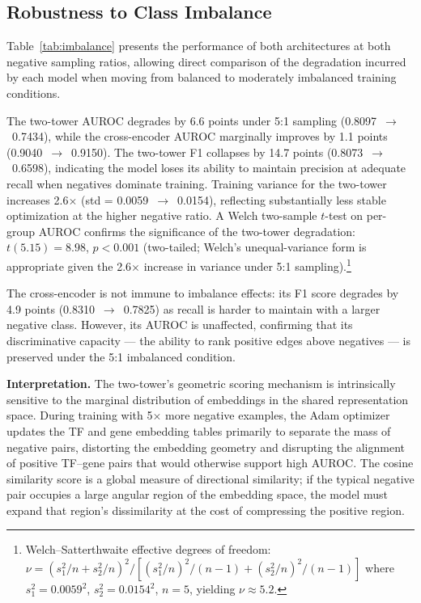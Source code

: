 \documentclass[journal]{IEEEtran}
\begin{document}
\subsection{Robustness to Class Imbalance}
\label{ssec:h2}

Table~\ref{tab:imbalance} presents the performance of both architectures at
both negative sampling ratios, allowing direct comparison of the degradation
incurred by each model when moving from balanced to moderately imbalanced
training conditions.

The two-tower AUROC degrades by 6.6 points under 5:1 sampling
(0.8097~$\to$~0.7434), while the cross-encoder AUROC marginally improves by
1.1 points (0.9040~$\to$~0.9150). The two-tower F1 collapses by 14.7 points
(0.8073~$\to$~0.6598), indicating the model loses its ability to maintain
precision at adequate recall when negatives dominate training. Training variance
for the two-tower increases 2.6$\times$ (std = 0.0059~$\to$~0.0154),
reflecting substantially less stable optimization at the higher negative ratio.
A Welch two-sample $t$-test on per-group AUROC confirms the significance of
the two-tower degradation: $t(5.15) = 8.98$, $p < 0.001$ (two-tailed;
Welch's unequal-variance form is appropriate given the 2.6$\times$ increase
in variance under 5:1 sampling).\footnote{Welch--Satterthwaite effective
degrees of freedom: $\nu = (s_1^2/n + s_2^2/n)^2 / [(s_1^2/n)^2/(n{-}1) +
(s_2^2/n)^2/(n{-}1)]$ where $s_1^2 = 0.0059^2$, $s_2^2 = 0.0154^2$,
$n = 5$, yielding $\nu \approx 5.2$.}

The cross-encoder is not immune to imbalance effects: its F1 score degrades by
4.9 points (0.8310~$\to$~0.7825) as recall is harder to maintain with a larger
negative class. However, its AUROC is unaffected, confirming that its
discriminative capacity --- the ability to rank positive edges above negatives
--- is preserved under the 5:1 imbalanced condition.

\textbf{Interpretation.} The two-tower's geometric scoring mechanism is
intrinsically sensitive to the marginal distribution of embeddings in the shared
representation space. During training with 5$\times$ more negative examples,
the Adam optimizer updates the TF and gene embedding tables primarily to
separate the mass of negative pairs, distorting the embedding geometry and
disrupting the alignment of positive TF--gene pairs that would otherwise support
high AUROC. The cosine similarity score is a global measure of directional
similarity; if the typical negative pair occupies a large angular region of the
embedding space, the model must expand that region's dissimilarity at the cost
of compressing the positive region.
\end{document}
